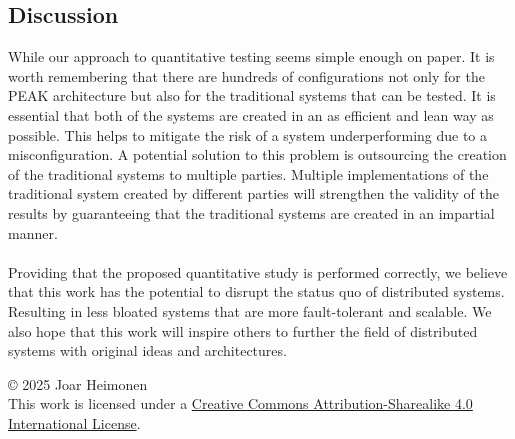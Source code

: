 \documentclass[12pt]{article}
\newcommand{\license}{
    \vspace{1em}
    \noindent\small{© 2025 Joar Heimonen\\
    This work is licensed under a \href{https://creativecommons.org/licenses/by-sa/4.0/}{Creative Commons Attribution-Sharealike 4.0 International License}.}
    \vspace{1em}
}
\begin{document}
\subsection{Discussion}
While our approach to quantitative testing \cite{creswellResearchDesignQualitative} seems simple enough on paper.
It is worth remembering that there are hundreds of configurations not only for the PEAK architecture but also for the traditional systems
that can be tested. It is essential that both of the systems are created in an as efficient and lean way as possible.
This helps to mitigate the risk of a system underperforming due to a misconfiguration.
A potential solution to this problem is outsourcing the creation of the traditional systems to multiple parties.
Multiple implementations of the traditional system created by different parties will strengthen the validity of the results
by guaranteeing that the traditional systems are created in an impartial manner.
\\
\\
Providing that the proposed quantitative study is performed correctly, we believe that this work 
has the potential to disrupt the status quo of distributed systems. Resulting in less bloated
systems that are more fault-tolerant and scalable. We also hope that this work will inspire others 
to further the field of distributed systems with original ideas and architectures.



\printbibliography
\license
\end{document}
